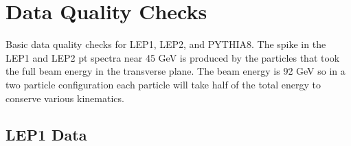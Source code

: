 \section{Data Quality Checks}


Basic data quality checks for LEP1, LEP2, and PYTHIA8. The spike in the LEP1 and LEP2 pt spectra near 45 GeV is produced by the particles that took the full beam energy in the transverse plane. The beam energy is 92 GeV so in a two particle configuration each particle will take half of the total energy to conserve various kinematics. 


\subsection{LEP1 Data}


